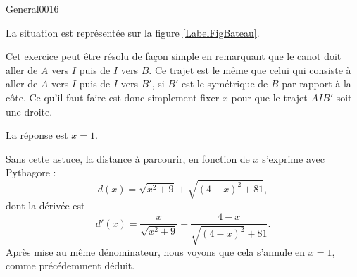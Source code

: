 \begin{corrige}{General0016}


La situation est représentée sur la figure \ref{LabelFigBateau}.

Cet exercice peut être résolu de façon simple en remarquant que le canot doit aller de $A$ vers $I$ puis de $I$ vers $B$. Ce trajet est le même que celui qui consiste à aller de $A$ vers $I$ puis de $I$ vers $B'$, si $B'$ est le symétrique de $B$ par rapport à la côte. Ce qu'il faut faire est donc simplement fixer $x$ pour que le trajet $AIB'$ soit une droite.

La réponse est $x=1$.

Sans cette astuce, la distance à parcourir, en fonction de $x$ s'exprime avec Pythagore :
\begin{equation}
	d(x)=\sqrt{x^2+9}+\sqrt{(4-x)^2+81},
\end{equation}
dont la dérivée est
\begin{equation}
	d'(x)=\frac{ x }{ \sqrt{x^2+9} }-\frac{ 4-x }{ \sqrt{(4-x)^2}+81 }.
\end{equation}
Après mise au même dénominateur, nous voyons que cela s'annule en $x=1$, comme précédemment déduit.

\newcommand{\CaptionFigBateau}{Petit dessin pour l'exercice \ref{exo0016}.}


\end{corrige}
